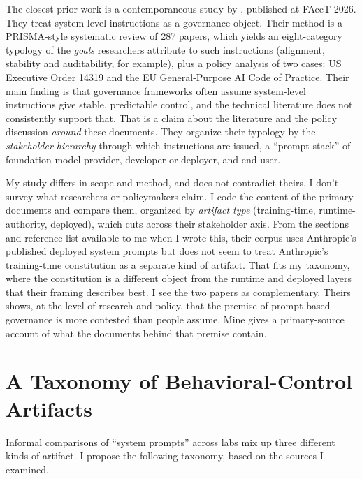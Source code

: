 \documentclass[11pt]{article}
\begin{document}
The closest prior work is a contemporaneous study by
\citet{neumann2026governance}, published at FAccT 2026. They treat
system-level instructions as a governance object. Their method is a
PRISMA-style systematic review of 287 papers, which yields an eight-category
typology of the \emph{goals} researchers attribute to such instructions
(alignment, stability and auditability, for example), plus a policy analysis
of two cases: US Executive Order 14319 and the EU General-Purpose AI Code of
Practice. Their main finding is that governance frameworks often assume
system-level instructions give stable, predictable control, and the technical
literature does not consistently support that. That is a claim about the
literature and the policy discussion \emph{around} these documents. They
organize their typology by the \emph{stakeholder hierarchy} through which
instructions are issued, a ``prompt stack'' of foundation-model provider,
developer or deployer, and end user.

My study differs in scope and method, and does not contradict theirs. I don't
survey what researchers or policymakers claim. I code the content of the
primary documents and compare them, organized by \emph{artifact type}
(training-time, runtime-authority, deployed), which cuts across their
stakeholder axis. From the sections and reference list available to me when I
wrote this, their corpus uses Anthropic's published deployed system prompts
but does not seem to treat Anthropic's training-time constitution as a
separate kind of artifact. That fits my taxonomy, where the constitution is a
different object from the runtime and deployed layers that their framing
describes best. I see the two papers as complementary. Theirs shows, at the
level of research and policy, that the premise of prompt-based governance is
more contested than people assume. Mine gives a primary-source account of what
the documents behind that premise contain.

\section{A Taxonomy of Behavioral-Control Artifacts}
\label{sec:taxonomy}

Informal comparisons of ``system prompts'' across labs mix up three different
kinds of artifact. I propose the following taxonomy, based on the sources I
examined.
\end{document}
